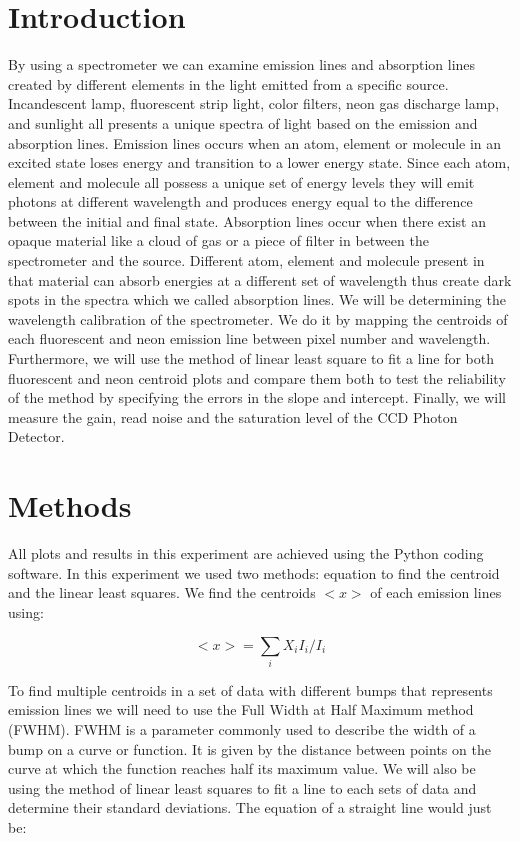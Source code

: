 \documentclass[onecolumn, 12pt, a4paper]{article}
\begin{document}
\section{Introduction}  \label{introduction}

By using a spectrometer we can examine emission lines and absorption lines created by different elements in the light emitted from a specific source. Incandescent lamp, fluorescent strip light, color filters, neon gas discharge lamp, and sunlight all presents a unique spectra of light based on the emission and absorption lines. Emission lines occurs when an atom, element or molecule in an excited state loses energy and transition to a lower energy state. Since each atom, element and molecule all possess a unique set of energy levels they will emit photons at different wavelength and produces energy equal to the difference between the initial and final state. Absorption lines occur when there exist an opaque material like a cloud of gas or a piece of filter in between the spectrometer and the source. Different atom, element and molecule present in that material can absorb energies at a different set of wavelength thus create dark spots in the spectra which we called absorption lines. We will be determining the wavelength calibration of the spectrometer. We do it by mapping the centroids of each fluorescent and neon emission line between pixel number and wavelength. Furthermore, we will use the method of linear least square to fit a line for both fluorescent and neon centroid plots and compare them both to test the reliability of the method by specifying the errors in the slope and intercept. Finally, we will measure the gain, read noise and the saturation level of the CCD Photon Detector.

\section{Methods} \label{methods}
All plots and results in this experiment are achieved using the Python coding software. In this experiment we used two methods: equation to find the centroid and the linear least squares. We find the centroids $<x>$ of each emission lines using: 

\[<x> = \sum_{i}{X_i I_i }/{I_i}\]  

To find multiple centroids in a set of data with different bumps that represents emission lines we will need to use the Full Width at Half Maximum method (FWHM).  FWHM is a parameter commonly used to describe the width of a bump on a curve or function. It is given by the distance between points on the curve at which the function reaches half its maximum value. We will also be using the method of linear least squares to fit a line to each sets of data and determine their standard deviations. The equation of a straight line would just be: 
\end{document}
